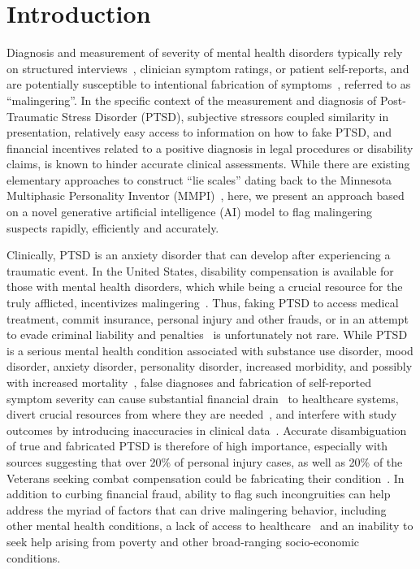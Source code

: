\documentclass[onecolumn,10pt]{IEEEtran}
\begin{document}
\section*{Introduction}
Diagnosis and measurement of severity of mental health disorders  typically  rely  on structured interviews~\cite{ali2015multimodal}, clinician symptom ratings, or patient self-reports, and are potentially susceptible to  intentional fabrication of  symptoms~\cite{Rogers1997,rogers2008clinical},  referred to as ``malingering''. In the specific context of the measurement and diagnosis of Post-Traumatic Stress Disorder (PTSD),  subjective stressors coupled similarity in presentation,   relatively easy access to information on  how to fake PTSD,  and financial  incentives related to a positive diagnosis  in  legal procedures or disability claims, is known to hinder accurate  clinical assessments.  While there are existing elementary approaches to construct ``lie scales'' dating back to the Minnesota Multiphasic Personality Inventor (MMPI)~\cite{butcher2010minnesota}, here, we present an approach based on a novel generative artificial intelligence (AI) model to flag malingering suspects rapidly, efficiently and accurately. %

Clinically, PTSD is an anxiety disorder that can develop after experiencing a traumatic event. In the United States,  disability compensation is   available for  those with mental health disorders, which while being a crucial resource for the truly afflicted, incentivizes malingering~\cite{frueh2007us,taylor2007detection}.  Thus,  faking PTSD to access medical treatment, commit insurance, personal injury and other frauds, or in an attempt to evade criminal liability and penalties~\cite{guriel2003assessing,salloway1990opiate,resnick2008malingering,burkett1998stolen} is unfortunately not rare. While  PTSD is a serious mental health condition  associated with  substance use disorder, mood disorder, anxiety disorder,  personality disorder, increased morbidity,  and possibly with increased  mortality~\cite{goldstein2016epidemiology,schnurr2009posttraumatic}, false diagnoses and fabrication of self-reported symptom severity can cause substantial financial drain~\cite{lopiccolo1999current, oboler2000disability} to  healthcare systems, divert crucial resources from where they are needed~\cite{taylor2006clinician}, and interfere with study outcomes by introducing inaccuracies in clinical data~\cite{rosen2006dsm}. Accurate disambiguation of true and fabricated PTSD is therefore of high importance, especially with sources suggesting that over 20\% of  personal injury cases, as well as  20\%  of the Veterans seeking combat compensation could be  fabricating their condition~\cite{marx2011ptsd,rogers1994explanatory,leeshaley1997mmpi2,frueh2007us}. In addition to curbing  financial fraud, ability to flag such incongruities can help address the myriad of   factors that can drive malingering behavior, including other mental health conditions, a lack of access to healthcare~\cite{park2021race,muntaner2004socioeconomic} and  an inability to seek help arising from poverty and other broad-ranging socio-economic conditions.
\end{document}
